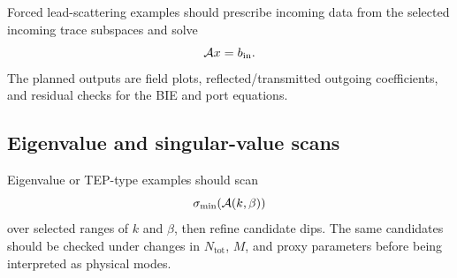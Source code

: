 Forced lead-scattering examples should prescribe incoming data from the selected
incoming trace subspaces and solve
\[
  \mathcal A x=b_{\mathrm{in}} .
\]
The planned outputs are field plots, reflected/transmitted outgoing
coefficients, and residual checks for the BIE and port equations.


\subsection{Eigenvalue and singular-value scans}

Eigenvalue or TEP-type examples should scan
\[
  \sigma_{\min}(\mathcal A(k,\beta))
\]
over selected ranges of \(k\) and \(\beta\), then refine candidate dips.  The
same candidates should be checked under changes in \(N_{\mathrm{tot}}\), \(M\),
and proxy parameters before being interpreted as physical modes.

